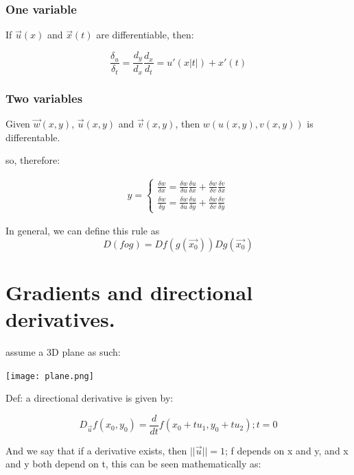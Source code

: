 \documentclass[11pt,fleqn]{book} %
\begin{document}
\subsubsection{One variable}
If $\vec{u}(x)$ and $\vec{x}(t)$ are differentiable, then: 

$$\frac{\delta_u}{\delta_t} = \frac{d_y}{d_x} \frac{d_x}{d_t} = u'(x|t|) + x'(t)$$

\subsubsection{Two variables}

Given  $\vec{w}(x,y)$, $\vec{u}(x,y)$ and $\vec{v}(x,y)$, then $w(u(x,y), v(x,y))$ is differentable.

so, therefore:

\begin{gather}
    y = 
    \begin{cases}
        \frac{\delta w}{\delta x} = \frac{\delta w}{\delta u} \frac{\delta u}{\delta x} + \frac{\delta w}{\delta v} \frac{\delta v}{\delta x} \\
        \frac{\delta w}{\delta y} = \frac{\delta w}{\delta u} \frac{\delta u}{\delta y} + \frac{\delta w}{\delta v} \frac{\delta v}{\delta y} 
    \end{cases}
\end{gather}


In general, we can define this rule as 
\begin{equation}
    D(f o g) = Df(g(\vec{x_0})) Dg(\vec{x_0})
\end{equation}

\section{Gradients and directional derivatives.}

assume a 3D plane as such:

\begin{center}
    \texttt{[image: plane.png]}
\end{center}

Def: a directional derivative is given by:

\begin{equation}
    D_{\vec{u}}f(x_0,y_0) = \frac{d}{dt} f(x_0 + t u_1, y_0 + t u_2) ; t = 0
\end{equation}

And we say that if a derivative exists, then $||\vec{u}|| = 1$;
f depends on x and y, and x and y both depend on t, this can be seen mathematically as:
\end{document}

